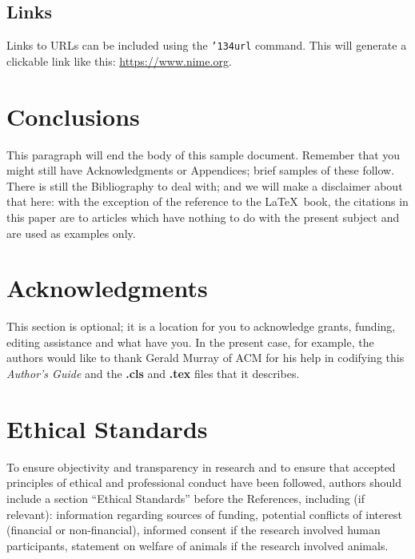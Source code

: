 \documentclass[sigconf]{nimepaper}
\begin{document}
\subsection{Links}

Links to URLs can be included using the \texttt{{\char'134}url} command. This will generate a clickable link like this: \url{https://www.nime.org}.


\section{Conclusions}
This paragraph will end the body of this sample document.
Remember that you might still have Acknowledgments or
Appendices; brief samples of these
follow.  There is still the Bibliography to deal with; and
we will make a disclaimer about that here: with the exception
of the reference to the \LaTeX\ book, the citations in
this paper are to articles which have nothing to
do with the present subject and are used as
examples only.

\section{Acknowledgments}
This section is optional; it is a location for you
to acknowledge grants, funding, editing assistance and
what have you.  In the present case, for example, the
authors would like to thank Gerald Murray of ACM for
his help in codifying this \textit{Author's Guide}
and the \textbf{.cls} and \textbf{.tex} files that it describes.



\section{Ethical Standards}
To ensure objectivity and transparency in research and to ensure that accepted principles of ethical and professional conduct have been followed, authors should include a section “Ethical Standards” before the References, including (if relevant): information regarding sources of funding, potential conflicts of interest (financial or non-financial), informed consent if the research involved human participants, statement on welfare of animals if the research involved animals.


%


\end{document}
